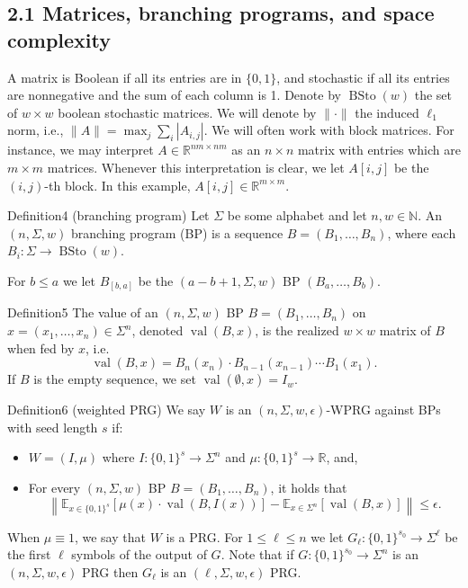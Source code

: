 \subsection*{2.1 Matrices, branching programs, and space complexity}
A matrix is Boolean if all its entries are in $\{0,1\}$, and stochastic if all its entries are nonnegative and the sum of each column is 1. Denote by $\operatorname{BSto}(w)$ the set of $w\times w$ boolean stochastic matrices. We will denote by $\|\cdot\|$ the induced $\ell_1$ norm, i.e., $\|A\|=\max_j\sum_i|A_{i,j}|$.
We will often work with block matrices. For instance, we may interpret $A\in\mathbb R^{nm\times nm}$ as an $n\times n$ matrix with entries which are $m\times m$ matrices. Whenever this interpretation is clear, we let $A[i,j]$ be the $(i,j)$-th block. In this example, $A[i,j]\in\mathbb R^{m\times m}$.
\begin{authorclaim}{Definition4 (branching program)}
Let $\Sigma$ be some alphabet and let $n,w\in\mathbb N$. An $(n,\Sigma,w)$ branching program (BP) is a sequence $B=(B_1,\ldots,B_n)$, where each $B_i:\Sigma\to\operatorname{BSto}(w)$.
\end{authorclaim}
For $b\le a$ we let $B_{[b,a]}$ be the $(a-b+1,\Sigma,w)$ BP $(B_a,\ldots,B_b)$.
\begin{authorclaim}{Definition5}
The value of an $(n,\Sigma,w)$ BP $B=(B_1,\ldots,B_n)$ on $x=(x_1,\ldots,x_n)\in\Sigma^n$, denoted $\operatorname{val}(B,x)$, is the realized $w\times w$ matrix of $B$ when fed by $x$, i.e.
\[\operatorname{val}(B,x)=B_n(x_n)\cdot B_{n-1}(x_{n-1})\cdots B_1(x_1).\]
If $B$ is the empty sequence, we set $\operatorname{val}(\emptyset,x)=I_w$.
\end{authorclaim}
\begin{authorclaim}{Definition6 (weighted PRG)}
We say $W$ is an $(n,\Sigma,w,\epsilon)$-WPRG against BPs with seed length $s$ if:
\begin{itemize}
\item $W=(I,\mu)$ where $I:\{0,1\}^s\to\Sigma^n$ and $\mu:\{0,1\}^s\to\mathbb R$, and,
\item For every $(n,\Sigma,w)$ BP $B=(B_1,\ldots,B_n)$, it holds that
\[\left\|\mathbb E_{x\in\{0,1\}^s}[\mu(x)\cdot\operatorname{val}(B,I(x))]-\mathbb E_{x\in\Sigma^n}[\operatorname{val}(B,x)]\right\|\le\epsilon.\]
\end{itemize}
\end{authorclaim}
When $\mu\equiv1$, we say that $W$ is a PRG.
For $1\le\ell\le n$ we let $G_\ell:\{0,1\}^{s_0}\to\Sigma^\ell$ be the first $\ell$ symbols of the output of $G$. Note that if $G:\{0,1\}^{s_0}\to\Sigma^n$ is an $(n,\Sigma,w,\epsilon)$ PRG then $G_\ell$ is an $(\ell,\Sigma,w,\epsilon)$ PRG.
